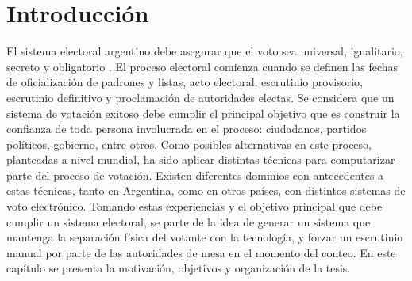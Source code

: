 \label{Introduccion}
\chapter{Introducción}
El sistema electoral argentino debe asegurar que el voto sea universal, igualitario, secreto y obligatorio \citep{arlettaz2012libertad}. El proceso electoral comienza cuando se definen las fechas de oficialización de padrones y listas, acto electoral, escrutinio provisorio, escrutinio definitivo y proclamación de autoridades electas. Se considera que un sistema de votación exitoso debe cumplir el principal objetivo que es construir la confianza de toda persona involucrada en el proceso: ciudadanos, partidos políticos, gobierno, entre otros. Como posibles alternativas en este proceso, planteadas a nivel mundial, ha sido aplicar distintas técnicas para computarizar parte del proceso de votación. Existen diferentes dominios con antecedentes a estas técnicas, tanto en Argentina, como en  otros  países,  con  distintos  sistemas  de  voto  electrónico. Tomando estas experiencias y el objetivo principal que debe cumplir un sistema electoral, se parte de la idea de generar un sistema que mantenga la separación física del votante con la tecnología, y forzar un escrutinio manual por parte de las autoridades de mesa en el momento del conteo. \newline
En este capítulo se presenta la motivación, objetivos y organización de la tesis.

